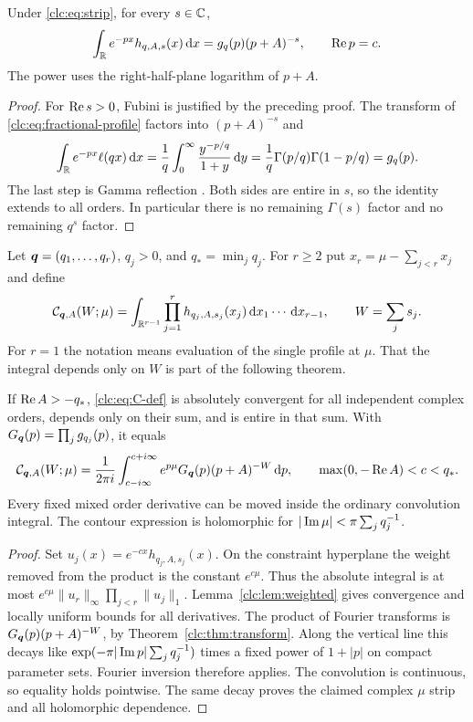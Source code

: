 \begin{theorem}\label{clc:thm:transform}
Under \eqref{clc:eq:strip}, for every $s\in\mathbb C$,
\begin{equation}\label{clc:eq:transform}
 \int_\mathbb R e^{-px}h_{q,A,s}(x)\,\mathrm d x
 =g_q(p)(p+A)^{-s},\qquad \operatorname{Re} p=c.
\end{equation}
The power uses the right-half-plane logarithm of $p+A$.
\end{theorem}
\begin{proof}
For $\operatorname{Re} s>0$, Fubini is justified by the preceding proof. The transform
of \eqref{clc:eq:fractional-profile} factors into $(p+A)^{-s}$ and
\[
 \int_\mathbb R e^{-px}\ell(qx)\,\mathrm d x
 =\frac1q\int_0^\infty\frac{y^{-p/q}}{1+y}\,\mathrm d y
 =\frac1q\Gamma(p/q)\Gamma(1-p/q)=g_q(p).
\]
The last step is Gamma reflection \cite{DLMF5}. Both sides are entire in
$s$, so the identity extends to all orders. In particular there is no
remaining $\Gamma(s)$ factor and no remaining $q^s$ factor.
\end{proof}

Let $\boldsymbol q=(q_1,\ldots,q_r)$, $q_j>0$, and $q_*=\min_jq_j$.
For $r\ge2$ put $x_r=\mu-\sum_{j<r}x_j$ and define
\begin{equation}\label{clc:eq:C-def}
 \mathcal C_{\boldsymbol q,A}(W;\mu)=
 \int_{\mathbb R^{r-1}}\prod_{j=1}^r h_{q_j,A,s_j}(x_j)
           \,\mathrm d x_1\cdots\,\mathrm d x_{r-1},\qquad W=\sum_js_j.
\end{equation}
For $r=1$ the notation means evaluation of the single profile at $\mu$.
That the integral depends only on $W$ is part of the following theorem.

\begin{theorem}
\label{clc:thm:addition}
If $\operatorname{Re} A>-q_*$, \eqref{clc:eq:C-def} is absolutely convergent for all
independent complex orders, depends only on their sum, and is entire in
that sum. With
$G_{\boldsymbol q}(p)=\prod_jg_{q_j}(p)$, it equals
\begin{equation}\label{clc:eq:C-contour}
 \mathcal C_{\boldsymbol q,A}(W;\mu)=\frac1{2\pi i}
 \int_{c-i\infty}^{c+i\infty}
 e^{p\mu}G_{\boldsymbol q}(p)(p+A)^{-W}\,\mathrm d p,
 \qquad \max(0,-\operatorname{Re} A)<c<q_*.
\end{equation}
Every fixed mixed order derivative can be moved inside the ordinary
convolution integral. The contour expression is holomorphic for
$|\operatorname{Im}\mu|<\pi\sum_jq_j^{-1}$.
\end{theorem}
\begin{proof}
Set $u_j(x)=e^{-cx}h_{q_j,A,s_j}(x)$. On the constraint hyperplane the
weight removed from the product is the constant $e^{c\mu}$. Thus the
absolute integral is at most
$e^{c\mu}\|u_r\|_\infty\prod_{j<r}\|u_j\|_1$.
Lemma~\ref{clc:lem:weighted} gives convergence and locally uniform bounds
for all derivatives. The product of Fourier transforms is
$G_{\boldsymbol q}(p)(p+A)^{-W}$, by Theorem~\ref{clc:thm:transform}.
Along the vertical line this decays like
$\exp(-\pi|\operatorname{Im} p|\sum_jq_j^{-1})$ times a fixed power of $1+|p|$
on compact parameter sets. Fourier inversion therefore applies. The
convolution is continuous, so equality holds pointwise. The same decay
proves the claimed complex $\mu$ strip and all holomorphic dependence.
\end{proof}

